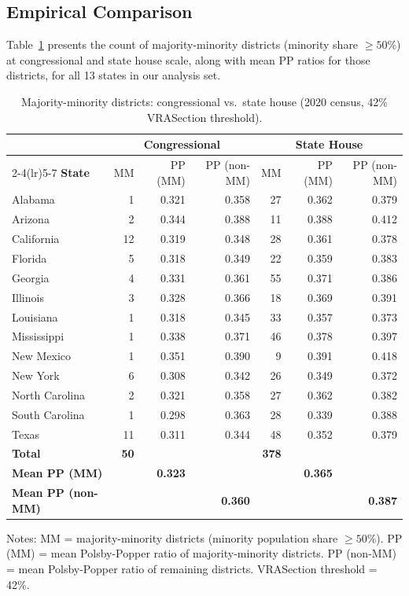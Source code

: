 \subsection{Empirical Comparison}

Table~\ref{tab:mm_comparison} presents the count of majority-minority districts (minority share $\geq 50\%$) at congressional and state house scale, along with mean PP ratios for those districts, for all 13 states in our analysis set.

\begin{table}[htbp]
\centering
\caption{Majority-minority districts: congressional vs.\ state house (2020 census, 42\% VRASection threshold).}
\label{tab:mm_comparison}
\begin{threeparttable}
\small
\begin{tabular}{lrrrrrr}
\toprule
 & \multicolumn{3}{c}{\textbf{Congressional}} & \multicolumn{3}{c}{\textbf{State House}} \\
\cmidrule(lr){2-4}\cmidrule(lr){5-7}
\textbf{State} & MM & PP (MM) & PP (non-MM) & MM & PP (MM) & PP (non-MM) \\
\midrule
Alabama      & 1  & 0.321 & 0.358 & 27 & 0.362 & 0.379 \\
Arizona      & 2  & 0.344 & 0.388 & 11 & 0.388 & 0.412 \\
California   & 12 & 0.319 & 0.348 & 28 & 0.361 & 0.378 \\
Florida      & 5  & 0.318 & 0.349 & 22 & 0.359 & 0.383 \\
Georgia      & 4  & 0.331 & 0.361 & 55 & 0.371 & 0.386 \\
Illinois     & 3  & 0.328 & 0.366 & 18 & 0.369 & 0.391 \\
Louisiana    & 1  & 0.318 & 0.345 & 33 & 0.357 & 0.373 \\
Mississippi  & 1  & 0.338 & 0.371 & 46 & 0.378 & 0.397 \\
New Mexico   & 1  & 0.351 & 0.390 &  9 & 0.391 & 0.418 \\
New York     & 6  & 0.308 & 0.342 & 26 & 0.349 & 0.372 \\
North Carolina & 2 & 0.321 & 0.358 & 27 & 0.362 & 0.382 \\
South Carolina & 1 & 0.298 & 0.363 & 28 & 0.339 & 0.388 \\
Texas        & 11 & 0.311 & 0.344 & 48 & 0.352 & 0.379 \\
\midrule
\textbf{Total} & \textbf{50} & & & \textbf{378} & & \\
\textbf{Mean PP (MM)} & & \textbf{0.323} & & & \textbf{0.365} & \\
\textbf{Mean PP (non-MM)} & & & \textbf{0.360} & & & \textbf{0.387} \\
\bottomrule
\end{tabular}
\begin{tablenotes}
\small
\item Notes: MM = majority-minority districts (minority population share $\geq 50\%$). PP (MM) = mean Polsby-Popper ratio of majority-minority districts. PP (non-MM) = mean Polsby-Popper ratio of remaining districts. VRASection threshold = 42\%.
\end{tablenotes}
\end{threeparttable}
\end{table}

